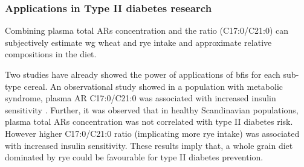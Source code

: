 \begin{table}[h!]
	\caption{Biomarkers of Wheat Intake Reported in Observation study}
	\label{table:wheat_observation}
\end{table}

\subsubsection{Applications in Type II diabetes research}

Combining plasma total ARs concentration and the ratio (C17:0/C21:0) can subjectively estimate \acrshort{wg} wheat and rye intake and approximate relative compositions in the diet.

Two studies have already showed the power of applications of \acrshort{bfis} for each sub-type cereal. An observational study showed in a population with metabolic syndrome, plasma AR C17:0/C21:0 was associated with increased insulin sensitivity \cite{ISI:000333777700008}. Further, it was observed that in healthy Scandinavian populations, plasma total ARs concentration was not correlated with type II diabetes risk. However higher C17:0/C21:0 ratio (implicating more rye intake) was associated with increased insulin sensitivity\cite{ISI:000378977200013}. These results imply that, a whole grain diet dominated by rye could be favourable for type II diabetes prevention. 

